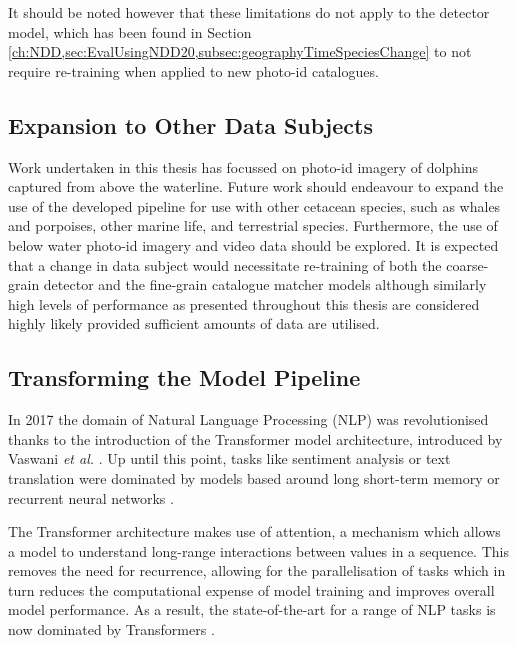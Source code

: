 It should be noted however that these limitations do not apply to the detector model, which has been found in Section \ref{ch:NDD,sec:EvalUsingNDD20,subsec:geographyTimeSpeciesChange} to not require re-training when applied to new photo-id catalogues.

\subsection{Expansion to Other Data Subjects}\label{ch:Conclusion,sec:FutureWork,sub:Underwater,Video,OtherCetaceans}

Work undertaken in this thesis has focussed on photo-id imagery of dolphins captured from above the waterline. Future work should endeavour to expand the use of the developed pipeline for use with other cetacean species, such as whales and porpoises, other marine life, and terrestrial species. Furthermore, the use of below water photo-id imagery \cite{van_bressem_visual_2018} and video data should be explored. It is expected that a change in data subject would necessitate re-training of both the coarse-grain detector and the fine-grain catalogue matcher models although similarly high levels of performance as presented throughout this thesis are considered highly likely provided sufficient amounts of data are utilised. 

\subsection{Transforming the Model Pipeline}\label{ch:Conclusion,sec:FutureWork,sub:Transformers}

In 2017 the domain of Natural Language Processing (NLP) was revolutionised thanks to the introduction of the Transformer model architecture, introduced by Vaswani \textit{et al.} \cite{vaswani_attention_2017}. Up until this point, tasks like sentiment analysis or text translation were dominated by models based around long short-term memory \cite{hochreiter_long_1997} or recurrent neural networks \cite{rumelhart_learning_1985}. 

The Transformer architecture makes use of attention, a mechanism which allows a model to understand long-range interactions between values in a sequence. This removes the need for recurrence, allowing for the parallelisation of tasks which in turn reduces the computational expense of model training and improves overall model performance. As a result, the state-of-the-art for a range of NLP tasks is now dominated by Transformers \cite{brown_language_2020, devlin_bert_2019, ng_facebook_2019, wolf_transformers_2020}. 


